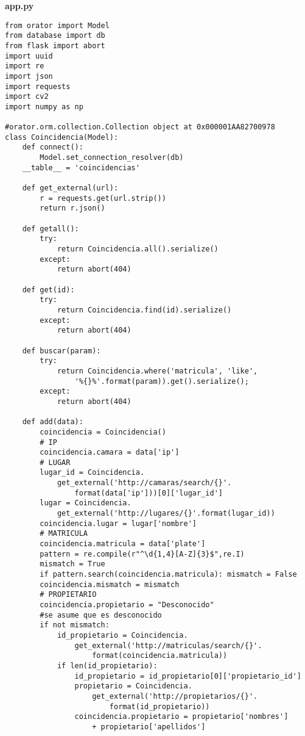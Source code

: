 {\sffamily \textbf{app.py}}
\begin{mdframed}[linecolor=black, topline=true, bottomline=true,
  leftline=false, rightline=false, backgroundcolor=LightGray,userdefinedwidth=\textwidth]
\begin{verbatim}
from orator import Model
from database import db
from flask import abort
import uuid
import re
import json
import requests
import cv2
import numpy as np

#orator.orm.collection.Collection object at 0x000001AA82700978
class Coincidencia(Model):
    def connect():
        Model.set_connection_resolver(db)
    __table__ = 'coincidencias'

    def get_external(url):
        r = requests.get(url.strip())
        return r.json()

    def getall(): 
        try:
            return Coincidencia.all().serialize()
        except:
            return abort(404)

    def get(id):
        try:
            return Coincidencia.find(id).serialize()
        except:
            return abort(404)

    def buscar(param):
        try:
            return Coincidencia.where('matricula', 'like',
                '%{}%'.format(param)).get().serialize();
        except:
            return abort(404)

    def add(data):
        coincidencia = Coincidencia()
        # IP
        coincidencia.camara = data['ip']
        # LUGAR
        lugar_id = Coincidencia.
            get_external('http://camaras/search/{}'.
                format(data['ip']))[0]['lugar_id']
        lugar = Coincidencia.
            get_external('http://lugares/{}'.format(lugar_id))
        coincidencia.lugar = lugar['nombre']
        # MATRICULA
        coincidencia.matricula = data['plate']
        pattern = re.compile(r"^\d{1,4}[A-Z]{3}$",re.I)
        mismatch = True
        if pattern.search(coincidencia.matricula): mismatch = False
        coincidencia.mismatch = mismatch
        # PROPIETARIO
        coincidencia.propietario = "Desconocido" 
        #se asume que es desconocido
        if not mismatch:
            id_propietario = Coincidencia.
                get_external('http://matriculas/search/{}'.
                    format(coincidencia.matricula))
            if len(id_propietario):
                id_propietario = id_propietario[0]['propietario_id']
                propietario = Coincidencia.
                    get_external('http://propietarios/{}'.
                        format(id_propietario))
                coincidencia.propietario = propietario['nombres'] 
                    + propietario['apellidos']
                

\end{verbatim}
\end{mdframed}
